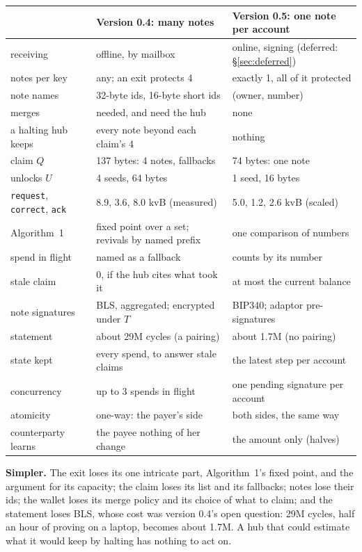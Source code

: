 \documentclass[11pt]{article}
\theoremstyle{plain}
\theoremstyle{definition}
\newcommand{\tx}[1]{\texttt{#1}}
\begin{document}
\begin{center}
\begin{tabularx}{\linewidth}{lLL}
\toprule
& Version 0.4: many notes & Version 0.5: one note per account \\
\midrule
receiving & offline, by mailbox & online, signing (deferred: \S\ref{sec:deferred}) \\
notes per key & any; an exit protects 4 & exactly 1, all of it protected \\
note names & 32-byte ids, 16-byte short ids & (owner, number) \\
merges & needed, and need the hub & none \\
a halting hub keeps & every note beyond each claim's 4 & nothing \\
claim $Q$ & 137 bytes: 4 notes, fallbacks & 74 bytes: one note \\
unlocks $U$ & 4 seeds, 64 bytes & 1 seed, 16 bytes \\
\tx{request}, \tx{correct}, \tx{ack} & 8.9, 3.6, 8.0 kvB (measured) & 5.0, 1.2, 2.6 kvB (scaled) \\
Algorithm~1 & fixed point over a set; revivals by named prefix & one comparison of numbers \\
spend in flight & named as a fallback & counts by its number \\
stale claim & 0, if the hub cites what took it & at most the current balance \\
note signatures & BLS, aggregated; encrypted under $T$ & BIP340; adaptor pre-signatures \\
statement & about 29M cycles (a pairing) & about 1.7M (no pairing) \\
state kept & every spend, to answer stale claims & the latest step per account \\
concurrency & up to 3 spends in flight & one pending signature per account \\
atomicity & one-way: the payer's side & both sides, the same way \\
counterparty learns & the payee nothing of her change & the amount only (halves) \\
\bottomrule
\end{tabularx}
\end{center}

\textbf{Simpler.} The exit loses its one intricate part, Algorithm~1's
fixed point, and the argument for its capacity; the claim loses its
list and its fallbacks; notes lose their ids; the wallet loses its merge
policy and its choice of what to claim; and the statement loses BLS,
whose cost was version 0.4's open question: 29M cycles, half an hour of
proving on a laptop, becomes about 1.7M. A hub that could estimate what
it would keep by halting has nothing to act on.
\end{document}
